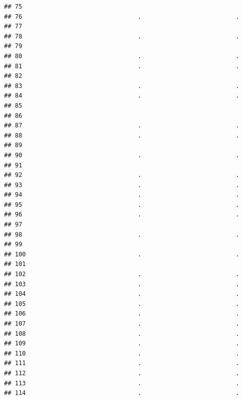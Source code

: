 \documentclass[
]{article}
\begin{document}
\begin{verbatim}
## 75                                                            
## 76                                .                          .
## 77                                                            
## 78                                .                          .
## 79                                                            
## 80                                .                          .
## 81                                .                          .
## 82                                                            
## 83                                .                          .
## 84                                .                          .
## 85                                                            
## 86                                                            
## 87                                .                          .
## 88                                .                          .
## 89                                                            
## 90                                .                          .
## 91                                                            
## 92                                .                          .
## 93                                .                          .
## 94                                .                          .
## 95                                .                          .
## 96                                .                          .
## 97                                                            
## 98                                .                          .
## 99                                                            
## 100                               .                          .
## 101                                                           
## 102                               .                          .
## 103                               .                          .
## 104                               .                          .
## 105                               .                          .
## 106                               .                          .
## 107                               .                          .
## 108                               .                          .
## 109                               .                          .
## 110                               .                          .
## 111                               .                          .
## 112                               .                          .
## 113                               .                          .
## 114                               .                          .

\end{verbatim}
\end{document}
